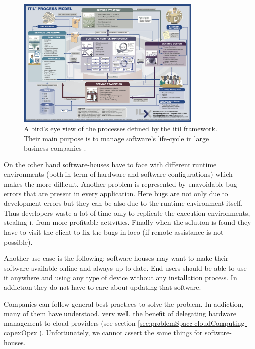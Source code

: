 \begin{figure}
	\centering{}
	\includegraphics[width=0.8\textwidth]{chapters/problem/images/itil-map.png}
	\caption[\acs{itil} v3 process model]{A bird's eye view of the processes defined by the \acf{itil} 
		framework. Their main purpose is to manage software's life-cycle in large business companies
		\cite{itilProcessModel}.}
	\label{img:problemSpace-useCases-itilProcessModel}
\end{figure}

On the other hand software-houses have to face with different runtime environments (both in term of
hardware and software configurations) which makes the  more difficult.
Another problem is represented by unavoidable bug errors that are present in every application. Here
bugs are not only due to development errors but they can be also due to the runtime environment itself.
Thus developers waste a lot of time only to replicate the execution environments, stealing it from
more profitable activities. Finally when the solution is found they have to visit the client to fix
the bugs in loco (if remote assistance is not possible).

Another use case is the following: software-houses may want to make their software available online
and always up-to-date. End users should be able to use it anywhere and using any type of device without
any installation process. In addiction they do not have to care about updating that software.

Companies can follow general best-practices to solve the problem. In addiction, many of them have
understood, very well, the benefit of delegating hardware management to cloud providers (see section
\ref{sec:problemSpace-cloudComputing-capexOpex}). Unfortunately, we cannot assert the same things for
software-houses.

